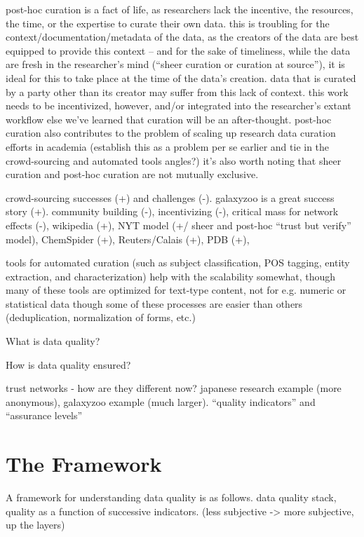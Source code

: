 \documentclass{acm_proc_article-sp}
\begin{document}
post-hoc curation is a fact of life, as researchers lack the
incentive, the resources, the time, or the expertise to curate their
own data. this is troubling for the context/documentation/metadata of
the data, as the creators of the data are best equipped to provide
this context -- and for the sake of timeliness, while the data are
fresh in the researcher's mind (``sheer curation or curation at
source''\cite{curry:community}), it is ideal for this to take place at
the time of the data's creation.  data that is curated by a party
other than its creator may suffer from this lack of context.  this
work needs to be incentivized, however, and/or integrated into the
researcher's extant workflow else we've learned that curation will be
an after-thought. post-hoc curation also contributes to the problem of
scaling up\cite{curry:community} research data curation efforts in
academia (establish this as a problem per se earlier and tie in the
crowd-sourcing and automated tools angles?) it's also worth noting
that sheer curation and post-hoc curation are not mutually exclusive.

crowd-sourcing successes (+) and challenges (-). galaxyzoo is a great
success story (+). community building (-), incentivizing (-), critical
mass for network effects (-), wikipedia (+), NYT model (+/ sheer and
post-hoc ``trust but verify'' model), ChemSpider (+), Reuters/Calais
(+), PDB (+), 

tools for automated curation (such as subject classification, POS
tagging, entity extraction, and characterization) help with the
scalability somewhat, though many of these tools are optimized for
text-type content, not for e.g. numeric or statistical data though
some of these processes are easier than others (deduplication,
normalization of forms, etc.)

What is data quality?

How is data quality ensured?

trust networks - how are they different now? japanese research example (more
anonymous), galaxyzoo example (much larger). ``quality indicators'' and
``assurance levels''

\section{The Framework}
A framework for understanding data quality is as follows.  data
quality stack, quality as a function of successive indicators. (less
subjective -> more subjective, up the layers)
\end{document}
